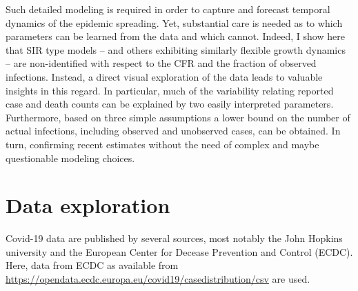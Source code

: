 \documentclass[fullpage,a4paper]{article}
\begin{document}
Such detailed modeling is required in order to capture and forecast
temporal dynamics of the epidemic spreading. Yet, substantial care is
needed as to which parameters can be learned from the data and which
cannot. Indeed, I show here that SIR type models -- and others
exhibiting similarly flexible growth dynamics -- are non-identified with
respect to the CFR and the fraction of observed infections.
Instead, a direct visual exploration of the data leads to valuable
insights in this regard. In particular, much of the variability
relating reported case and death counts can be explained by two easily
interpreted parameters. Furthermore, based on three simple assumptions
a lower bound on the number of actual infections, including observed
and unobserved cases, can be obtained. In turn, confirming recent
estimates without the need of complex and maybe questionable modeling
choices.

\section{Data exploration}

Covid-19 data are published by several sources, most notably the John
Hopkins university and the European Center for Decease Prevention and
Control (ECDC). Here, data from ECDC as available from
\url{https://opendata.ecdc.europa.eu/covid19/casedistribution/csv} are
used.
\end{document}
